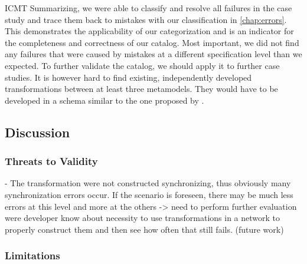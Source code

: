 \begin{copiedFrom}{ICMT}
Summarizing, we were able to classify and resolve all failures in the case study and trace them back to mistakes with our classification in \autoref{chap:errors}.
This demonstrates the applicability of our categorization and is an indicator for the completeness and correctness of our catalog.
Most important, we did not find any failures that were caused by mistakes at a different specification level than we expected.
To further validate the catalog, we should apply it to further case studies.
It is however hard to find existing, independently developed transformations between at least three metamodels.
They would have to be developed in a schema similar to the one proposed by \textcite{kramer2016c}.




\end{copiedFrom} %


\subsection{Discussion}


\subsubsection{Threats to Validity}
- The transformation were not constructed synchronizing, thus obviously many synchronization errors occur. If the scenario is foreseen, there may be much less errors at this level and more at the others -> need to perform further evaluation were developer know about necessity to use transformations in a network to properly construct them and then see how often that still fails. (future work)


\subsubsection{Limitations}

